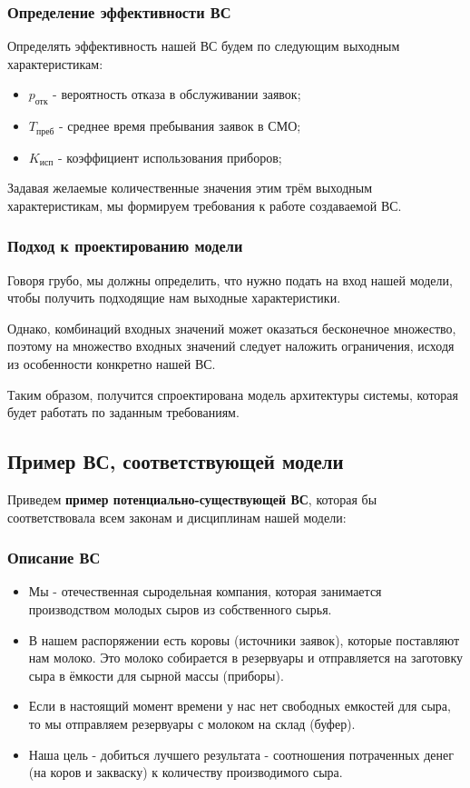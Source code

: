 \documentclass[a4paper, 14pt]{article}
\begin{document}
\subsubsection{Определение эффективности ВС}

Определять эффективность нашей ВС будем по следующим выходным характеристикам:

\begin{itemize}
	\item $p_\text{отк}$ - вероятность отказа в обслуживании заявок;
	\item $T_\text{преб}$ - среднее время пребывания заявок в СМО;
	\item $K_\text{исп}$ - коэффициент использования приборов;
\end{itemize}

Задавая желаемые количественные значения этим трём выходным характеристикам, мы формируем требования к работе создаваемой ВС.

\subsubsection{Подход к проектированию модели}

Говоря грубо, мы должны определить, что нужно подать на вход нашей модели, чтобы получить подходящие нам выходные характеристики.

Однако, комбинаций входных значений может оказаться бесконечное множество, поэтому на множество входных значений следует наложить ограничения, исходя из особенности конкретно нашей ВС.

Таким образом, получится спроектирована модель архитектуры системы, которая будет работать по заданным требованиям.

\subsection{Пример ВС, соответствующей модели}


Приведем \textbf{пример потенциально-существующей ВС}, которая бы соответствовала всем законам и дисциплинам нашей модели:


\subsubsection{Описание ВС}

\begin{itemize}
	\item Мы - отечественная сыродельная компания, которая занимается производством молодых сыров из собственного сырья.
	\item В нашем распоряжении есть коровы (источники заявок), которые поставляют нам молоко. Это молоко собирается в резервуары и отправляется на заготовку сыра в ёмкости для сырной массы (приборы).
	\item Если в настоящий момент времени у нас нет свободных емкостей для сыра, то мы отправляем резервуары с молоком на склад (буфер).
	\item Наша цель - добиться лучшего результата - соотношения потраченных денег (на коров и закваску) к количеству производимого сыра.
\end{itemize}
\end{document}
